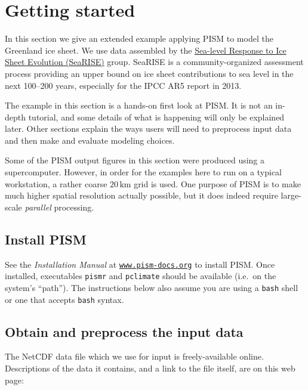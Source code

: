 
\section{Getting started}\label{sec:start}

In this section we give an extended example applying PISM to model the Greenland ice sheet.  We use data assembled by the \href{http://websrv.cs.umt.edu/isis/index.php/SeaRISE_Assessment}{Sea-level Response to Ice Sheet Evolution (SeaRISE)} group.  SeaRISE is a community-organized assessment process providing an upper bound on ice sheet contributions to sea level in the next 100--200 years, especially for the IPCC AR5 report in 2013.

The example in this section is a hands-on first look at PISM.  It is not an in-depth tutorial, and some details of what is happening will only be explained later.  Other sections explain the ways users will need to preprocess input data and then make and evaluate modeling choices.

Some of the PISM output figures in this section were produced using a supercomputer.  However, in order for the examples here to run on a typical workstation, a rather coarse $20\,\textrm{km}$ grid is used.  One purpose of PISM is to make much higher spatial resolution actually possible, but it does indeed require large-scale \emph{parallel} processing.


\subsection{Install PISM}

See the \emph{Installation Manual} at \href{http://www.pism-docs.org}{\texttt{www.pism-docs.org}}
to install PISM.  Once installed, executables \texttt{pismr} and \texttt{pclimate} should be available (i.e.~on the system's ``path'').  The instructions below also assume you are using a \texttt{bash} shell or one that accepts \texttt{bash} syntax.


\subsection{Obtain and preprocess the input data}

The NetCDF data file which we use for input is freely-available online.  Descriptions of the data it contains, and a link to the file itself, are on this web page: 
\medskip

\centerline{}
\medskip

